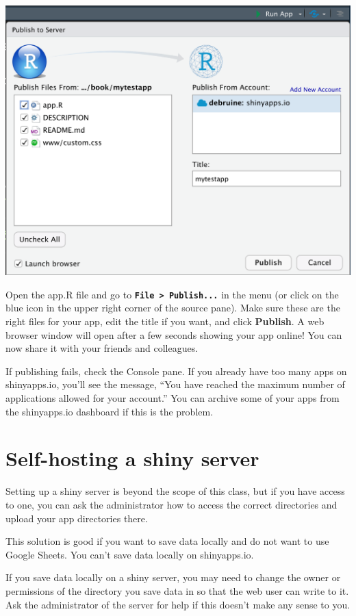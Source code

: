 \documentclass[
]{book}
\begin{document}
\includegraphics{images/saio_publish.png}

Open the app.R file and go to \textbf{\texttt{File\ \textgreater{}\ Publish...}} in the menu (or click on the blue icon in the upper right corner of the source pane). Make sure these are the right files for your app, edit the title if you want, and click \textbf{Publish}. A web browser window will open after a few seconds showing your app online! You can now share it with your friends and colleagues.

If publishing fails, check the Console pane. If you already have too many apps on shinyapps.io, you'll see the message, ``You have reached the maximum number of applications allowed for your account.'' You can archive some of your apps from the shinyapps.io dashboard if this is the problem.

\hypertarget{self-hosting-a-shiny-server}{%
\section{Self-hosting a shiny server}\label{self-hosting-a-shiny-server}}

Setting up a shiny server is beyond the scope of this class, but if you have access to one, you can ask the administrator how to access the correct directories and upload your app directories there.

This solution is good if you want to save data locally and do not want to use Google Sheets. You can't save data locally on shinyapps.io.

If you save data locally on a shiny server, you may need to change the owner or permissions of the directory you save data in so that the web user can write to it. Ask the administrator of the server for help if this doesn't make any sense to you.
\end{document}

